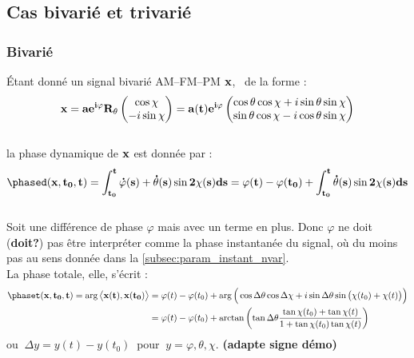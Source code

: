 \subsection{Cas bivarié et trivarié}

\subsubsection{Bivarié}

\begin{proposition}\label{prop:phased/t_2var}
	\'Etant donné un signal bivarié AM--FM--PM $\bf{x}$, \ie~de la forme :
	\begin{equation}\label{eq:exp_elliptik_2var}
		\bf{x} = ae^{i\varphi} R_{\theta} \begin{pmatrix} \cos\chi \\ -i\sin\chi \end{pmatrix} 
			= a(t)e^{i\varphi} \begin{pmatrix} \cos\theta \cos\chi + i\sin\theta \sin\chi \\ \sin\theta \cos\chi - i\cos\theta \sin\chi \end{pmatrix}
	\end{equation}
	\\
	la phase dynamique de $\bf{x}$ est donnée par :
	\begin{equation}\label{eq:phased_2var}
		\phased(\bf{x}, t_0,t) = \int_{t_0}^t \dot{\varphi}(s) + \dot{\theta}(s) \sin2\chi(s) ds = \varphi(t) -\varphi(t_0) + \int_{t_0}^t\dot{\theta}(s) \sin2\chi(s) ds
	\end{equation}
	\\
	Soit une différence de phase $\varphi$ mais avec un terme en plus. Donc $\varphi$ ne doit (\textbf{doit?}) pas être interpréter comme la phase instantanée du signal, où du moins pas au sens donnée dans la \cref{subsec:param_instant_nvar}.
	\\
	La phase totale, elle, s'écrit :
	\begin{equation}\label{eq:phaset_2var}
		\begin{aligned}
			\phaset(\bf{x},t_0,t) = \arg\big\langle \bf{x}(t), \bf{x}(t_0)\big\rangle &= \varphi(t)-\varphi(t_0) + \arg\Big(\cos\Delta\theta \cos\Delta\chi + i\sin\Delta\theta \sin\big(\chi(t_0)+\chi(t)\big)\Big) \\
			&= \varphi(t)-\varphi(t_0) + \arctan\left(\tan\Delta\theta \frac{ \tan\chi(t_0)+\tan\chi(t)}{1 + \tan\chi(t_0)\tan\chi(t)}\right)
		\end{aligned}
	\end{equation}
	ou $\ \Delta y = y(t) - y(t_0)\ $ pour $\ y=\varphi,\theta,\chi$. \textbf{(adapte signe démo)}
\end{proposition}

